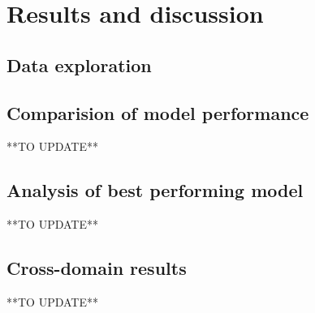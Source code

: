\chapter{Results and discussion}

\section{Data exploration}


\section{Comparision of model performance}
**TO UPDATE**

\section{Analysis of best performing model}
**TO UPDATE**

\section{Cross-domain results}
**TO UPDATE**